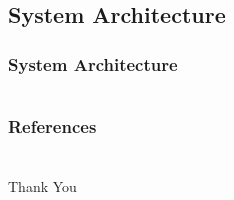 \documentclass[t]{beamer}
\begin{document}
\subsection{System Architecture}
\begin{frame}[c]
    \frametitle{System Architecture}
    \begin{figure}
        \centering
        \def\svgwidth{\columnwidth}
        \resizebox{1.0\textwidth}{!}{}
    \end{figure}
\end{frame}

\section{}
\begin{frame}
    \frametitle{References}
    \nocite{*}
    \printbibliography     
\end{frame}

\section{}
\begin{frame}[c]
    \centering
    \Huge Thank You
\end{frame}
\end{document}
